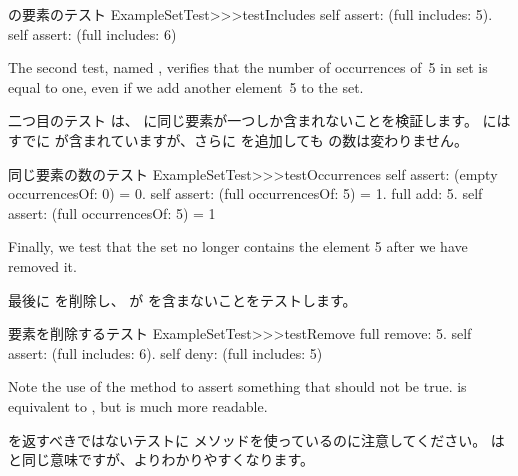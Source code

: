 \documentclass[a4paper,10pt,twoside]{book}
\begin{document}
{%
\begin{method}[testIncludes]{ の要素のテスト}
ExampleSetTest>>>testIncludes
	self assert: (full includes: 5).
	self assert: (full includes: 6)
\end{method}

The second test, named , verifies that the
number of occurrences of~5 in  set is equal to one, even if we
add another element~5 to the set.
\fi

二つ目のテスト  は、  に同じ要素が一つしか含まれないことを検証します。  にはすでに  が含まれていますが、さらに  を追加しても  の数は変わりません。

\begin{method}[testOccurrences]{同じ要素の数のテスト}
ExampleSetTest>>>testOccurrences
	self assert: (empty occurrencesOf: 0) = 0.
	self assert: (full occurrencesOf: 5) = 1.
	full add: 5.
	self assert: (full occurrencesOf: 5) = 1
\end{method}

Finally, we test that the set no
longer contains the element 5 after we have removed it.
\fi

最後に  を削除し、  が  を含まないことをテストします。

\begin{method}[testRemove]{要素を削除するテスト}
ExampleSetTest>>>testRemove
	full remove: 5.
	self assert: (full includes: 6).
	self deny: (full includes: 5)
\end{method}

\noindent
Note the use of the method  to assert something that should not be true.
 is equivalent to , but is much more readable.
\fi

\noindent
{} を返すべきではないテストに  メソッドを使っているのに注意してください。
 は  と同じ意味ですが、よりわかりやすくなります。

}
\end{document}
